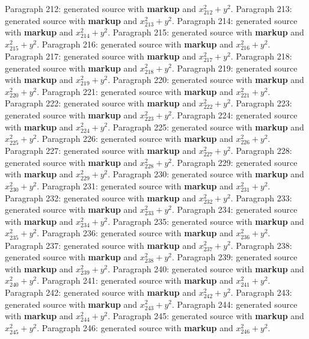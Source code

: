 \documentclass{article}
\begin{document}
Paragraph 212: generated source with \textbf{markup} and $x_{212}^2 + y^2$.
Paragraph 213: generated source with \textbf{markup} and $x_{213}^2 + y^2$.
Paragraph 214: generated source with \textbf{markup} and $x_{214}^2 + y^2$.
Paragraph 215: generated source with \textbf{markup} and $x_{215}^2 + y^2$.
Paragraph 216: generated source with \textbf{markup} and $x_{216}^2 + y^2$.
Paragraph 217: generated source with \textbf{markup} and $x_{217}^2 + y^2$.
Paragraph 218: generated source with \textbf{markup} and $x_{218}^2 + y^2$.
Paragraph 219: generated source with \textbf{markup} and $x_{219}^2 + y^2$.
Paragraph 220: generated source with \textbf{markup} and $x_{220}^2 + y^2$.
Paragraph 221: generated source with \textbf{markup} and $x_{221}^2 + y^2$.
Paragraph 222: generated source with \textbf{markup} and $x_{222}^2 + y^2$.
Paragraph 223: generated source with \textbf{markup} and $x_{223}^2 + y^2$.
Paragraph 224: generated source with \textbf{markup} and $x_{224}^2 + y^2$.
Paragraph 225: generated source with \textbf{markup} and $x_{225}^2 + y^2$.
Paragraph 226: generated source with \textbf{markup} and $x_{226}^2 + y^2$.
Paragraph 227: generated source with \textbf{markup} and $x_{227}^2 + y^2$.
Paragraph 228: generated source with \textbf{markup} and $x_{228}^2 + y^2$.
Paragraph 229: generated source with \textbf{markup} and $x_{229}^2 + y^2$.
Paragraph 230: generated source with \textbf{markup} and $x_{230}^2 + y^2$.
Paragraph 231: generated source with \textbf{markup} and $x_{231}^2 + y^2$.
Paragraph 232: generated source with \textbf{markup} and $x_{232}^2 + y^2$.
Paragraph 233: generated source with \textbf{markup} and $x_{233}^2 + y^2$.
Paragraph 234: generated source with \textbf{markup} and $x_{234}^2 + y^2$.
Paragraph 235: generated source with \textbf{markup} and $x_{235}^2 + y^2$.
Paragraph 236: generated source with \textbf{markup} and $x_{236}^2 + y^2$.
Paragraph 237: generated source with \textbf{markup} and $x_{237}^2 + y^2$.
Paragraph 238: generated source with \textbf{markup} and $x_{238}^2 + y^2$.
Paragraph 239: generated source with \textbf{markup} and $x_{239}^2 + y^2$.
Paragraph 240: generated source with \textbf{markup} and $x_{240}^2 + y^2$.
Paragraph 241: generated source with \textbf{markup} and $x_{241}^2 + y^2$.
Paragraph 242: generated source with \textbf{markup} and $x_{242}^2 + y^2$.
Paragraph 243: generated source with \textbf{markup} and $x_{243}^2 + y^2$.
Paragraph 244: generated source with \textbf{markup} and $x_{244}^2 + y^2$.
Paragraph 245: generated source with \textbf{markup} and $x_{245}^2 + y^2$.
Paragraph 246: generated source with \textbf{markup} and $x_{246}^2 + y^2$.
\end{document}

